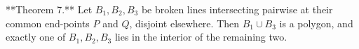 **Theorem 7.** Let $B_1, B_2, B_3$ be broken lines intersecting pairwise at their common end-points $P$ and $Q$, disjoint elsewhere. Then $B_1 \cup B_3$ is a polygon, and exactly one of $B_1, B_2, B_3$ lies in the interior of the remaining two.
